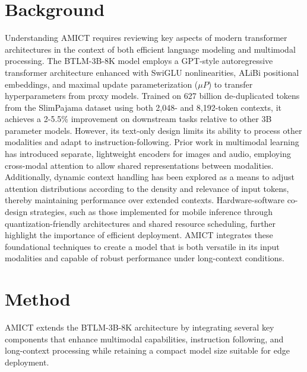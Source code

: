 \documentclass{article} %
\begin{document}
\section{Background}
\label{sec:background}
Understanding AMICT requires reviewing key aspects of modern transformer architectures in the context of both efficient language modeling and multimodal processing. The BTLM-3B-8K model employs a GPT-style autoregressive transformer architecture enhanced with SwiGLU nonlinearities\citep{Sotiras2013}, ALiBi positional embeddings\citep{Giannakis2013}, and maximal update parameterization (\(\mu P\))\citep{Ventsel2002} to transfer hyperparameters from proxy models. Trained on 627 billion de-duplicated tokens from the SlimPajama dataset\citep{Lovasz2019} using both 2,048- and 8,192-token contexts, it achieves a 2-5.5\% improvement on downstream tasks relative to other 3B parameter models. However, its text-only design limits its ability to process other modalities and adapt to instruction-following. Prior work in multimodal learning has introduced separate, lightweight encoders for images and audio, employing cross-modal attention to allow shared representations between modalities. Additionally, dynamic context handling has been explored as a means to adjust attention distributions according to the density and relevance of input tokens, thereby maintaining performance over extended contexts. Hardware-software co-design strategies, such as those implemented for mobile inference through quantization-friendly architectures and shared resource scheduling, further highlight the importance of efficient deployment. AMICT integrates these foundational techniques to create a model that is both versatile in its input modalities and capable of robust performance under long-context conditions.

\section{Method}
\label{sec:method}
AMICT extends the BTLM-3B-8K architecture by integrating several key components that enhance multimodal capabilities, instruction following, and long-context processing while retaining a compact model size suitable for edge deployment.
\end{document}
